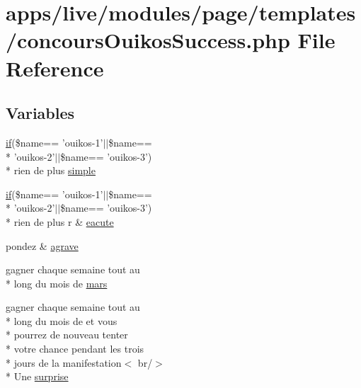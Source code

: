\hypertarget{live_2modules_2page_2templates_2concours_ouikos_success_8php}{\section{apps/live/modules/page/templates/concours\-Ouikos\-Success.php File Reference}
\label{live_2modules_2page_2templates_2concours_ouikos_success_8php}
}
\subsection*{Variables}
\begin{DoxyCompactItemize}
\item 
\hyperlink{live_2modules_2tournament_2templates_2__form_team_8php_ae30a307b320d8da5d9a945eaf68f7549}{if}(\$name== 'ouikos-\/1'$|$$|$\$name== \\*
'ouikos-\/2'$|$$|$\$name== 'ouikos-\/3') \\*
rien de plus \hyperlink{live_2modules_2page_2templates_2concours_ouikos_success_8php_acf9918059e86404da5434fe38d192d62}{simple}
\item 
\hyperlink{live_2modules_2tournament_2templates_2__form_team_8php_ae30a307b320d8da5d9a945eaf68f7549}{if}(\$name== 'ouikos-\/1'$|$$|$\$name== \\*
'ouikos-\/2'$|$$|$\$name== 'ouikos-\/3') \\*
rien de plus r \& \hyperlink{live_2modules_2page_2templates_2concours_ouikos_success_8php_a5c9a34c76cebfd8ae481fa185a4530af}{eacute}
\item 
pondez \& \hyperlink{live_2modules_2page_2templates_2concours_ouikos_success_8php_adcbedde811e3c81b65c252edf38caea2}{agrave}
\item 
gagner chaque semaine tout au \\*
long du mois de \hyperlink{live_2modules_2page_2templates_2concours_ouikos_success_8php_a750c51d77a2a60f666d47fce2c5fa35b}{mars}
\item 
gagner chaque semaine tout au \\*
long du mois de et vous \\*
pourrez de nouveau tenter \\*
votre chance pendant les trois \\*
jours de la manifestation$<$ br/$>$\\*
 Une \hyperlink{live_2modules_2page_2templates_2concours_ouikos_success_8php_a1904ff8bd57e228d157eeb2bea88cacf}{surprise}

\end{DoxyCompactItemize}
